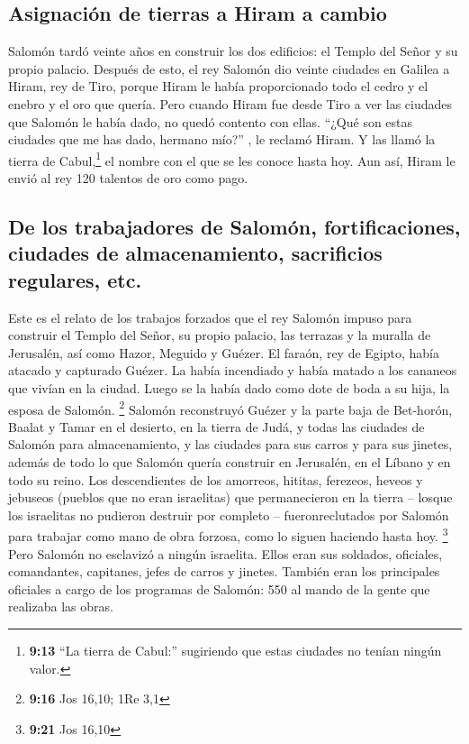 \hypertarget{asignaciuxf3n-de-tierras-a-hiram-a-cambio}{%
\subsection{Asignación de tierras a Hiram a
cambio}\label{asignaciuxf3n-de-tierras-a-hiram-a-cambio}}

 Salomón tardó veinte años en construir los dos
edificios: el Templo del Señor y su propio palacio. Después de esto,
 el rey Salomón dio veinte ciudades en Galilea a Hiram,
rey de Tiro, porque Hiram le había proporcionado todo el cedro y el
enebro y el oro que quería.  Pero cuando Hiram fue desde
Tiro a ver las ciudades que Salomón le había dado, no quedó contento con
ellas.  ``¿Qué son estas ciudades que me has dado,
hermano mío?'' , le reclamó Hiram. Y las llamó la tierra de
Cabul,\footnote{\textbf{9:13} ``La tierra de Cabul:'' sugiriendo que
  estas ciudades no tenían ningún valor.} el nombre con el que se les
conoce hasta hoy.  Aun así, Hiram le envió al rey 120
talentos de oro como pago.

\hypertarget{de-los-trabajadores-de-salomuxf3n-fortificaciones-ciudades-de-almacenamiento-sacrificios-regulares-etc.}{%
\subsection{De los trabajadores de Salomón, fortificaciones, ciudades de
almacenamiento, sacrificios regulares,
etc.}\label{de-los-trabajadores-de-salomuxf3n-fortificaciones-ciudades-de-almacenamiento-sacrificios-regulares-etc.}}

 Este es el relato de los trabajos forzados que el rey
Salomón impuso para construir el Templo del Señor, su propio palacio,
las terrazas y la muralla de Jerusalén, así como Hazor, Meguido y
Guézer.  El faraón, rey de Egipto, había atacado y
capturado Guézer. La había incendiado y había matado a los cananeos que
vivían en la ciudad. Luego se la había dado como dote de boda a su hija,
la esposa de Salomón. \footnote{\textbf{9:16} Jos 16,10; 1Re 3,1}
 Salomón reconstruyó Guézer y la parte baja de Bet-horón,
 Baalat y Tamar en el desierto, en la tierra de Judá,
 y todas las ciudades de Salomón para almacenamiento, y
las ciudades para sus carros y para sus jinetes, además de todo lo que
Salomón quería construir en Jerusalén, en el Líbano y en todo su reino.
 Los descendientes de los amorreos, hititas, ferezeos,
heveos y jebuseos (pueblos que no eran israelitas)  que
permanecieron en la tierra -- losque los israelitas no pudieron destruir
por completo -- fueronreclutados por Salomón para trabajar como mano de
obra forzosa, como lo siguen haciendo hasta hoy. \footnote{\textbf{9:21}
  Jos 16,10}  Pero Salomón no esclavizó a ningún
israelita. Ellos eran sus soldados, oficiales, comandantes, capitanes,
jefes de carros y jinetes.  También eran los principales
oficiales a cargo de los programas de Salomón: 550 al mando de la gente
que realizaba las obras.

